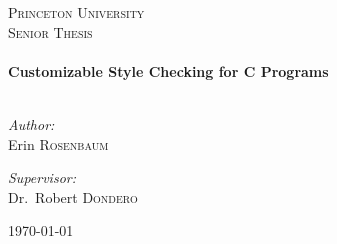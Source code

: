 \begin{titlepage}

\begin{center}


\textsc{\LARGE Princeton University}\\[1.5cm]

\textsc{\Large Senior Thesis}\\[0.5cm]

\HRule \\[0.4cm]
{ \huge \bfseries Customizable Style Checking for C Programs}\\[0.4cm]

\HRule \\[1.5cm]

\begin{minipage}{0.4\textwidth}
\begin{flushleft} \large
\emph{Author:}\\
Erin \textsc{Rosenbaum}
\end{flushleft}
\end{minipage}
\begin{minipage}{0.4\textwidth}
\begin{flushright} \large
\emph{Supervisor:} \\
Dr.~Robert \textsc{Dondero}
\end{flushright}
\end{minipage}

\vfill

{\large \today}

\end{center}

\end{titlepage}
